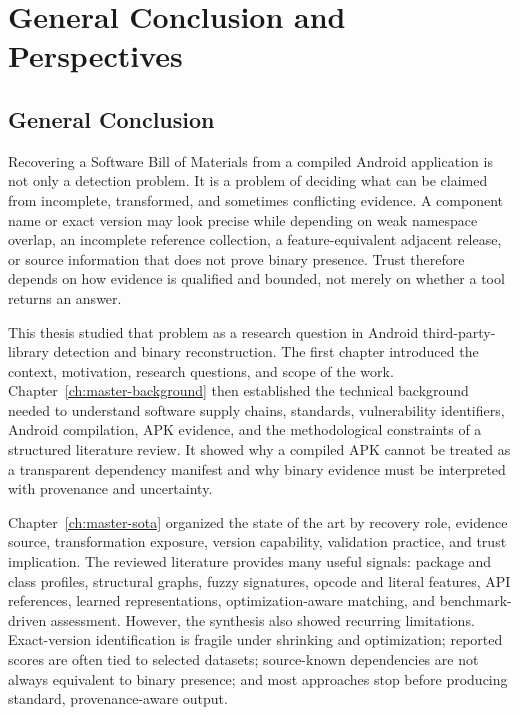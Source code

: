 \chapter[General Conclusion and Perspectives]{General Conclusion and\\ Perspectives}
\label{ch:master-conclusion}

\section{General Conclusion}

Recovering a Software Bill of Materials from a compiled Android application is
not only a detection problem. It is a problem of deciding what can be claimed
from incomplete, transformed, and sometimes conflicting evidence. A component
name or exact version may look precise while depending on weak namespace
overlap, an incomplete reference collection, a feature-equivalent adjacent
release, or source information that does not prove binary presence. Trust
therefore depends on how evidence is qualified and bounded, not merely on
whether a tool returns an answer.

This thesis studied that problem as a research question in Android
third-party-library detection and binary \SBOM reconstruction. The first
chapter introduced the context, motivation, research questions, and scope of
the work. Chapter~\ref{ch:master-background} then established the technical
background needed to understand software supply chains, \SBOM standards,
vulnerability identifiers, Android compilation, APK evidence, and the
methodological constraints of a structured literature review. It showed why a
compiled APK cannot be treated as a transparent dependency manifest and why
binary evidence must be interpreted with provenance and uncertainty.

Chapter~\ref{ch:master-sota} organized the state of the art by recovery role,
evidence source, transformation exposure, version capability, validation
practice, and trust implication. The reviewed literature provides many useful
signals: package and class profiles, structural graphs, fuzzy signatures,
opcode and literal features, API references, learned representations,
optimization-aware matching, and benchmark-driven assessment. However, the
synthesis also showed recurring limitations. Exact-version identification is
fragile under shrinking and optimization; reported scores are often tied to
selected datasets; source-known dependencies are not always equivalent to
binary presence; and most approaches stop before producing standard,
provenance-aware \SBOM output.


